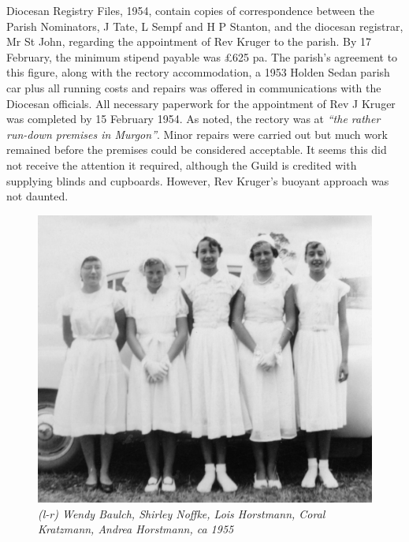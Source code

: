Diocesan Registry Files, 1954, contain copies of correspondence between the Parish Nominators, J Tate, L Sempf and H P Stanton, and the diocesan registrar, Mr St John, regarding the appointment of Rev Kruger to the parish. By 17 February, the minimum stipend payable was \pounds625 pa. The parish's agreement to this figure, along with the rectory accommodation, a 1953 Holden Sedan parish car plus all running costs and repairs was offered in communications with the Diocesan officials. All necessary paperwork for the appointment of Rev J Kruger was completed by 15 February 1954. As noted, the rectory was at \emph{``the rather run-down premises in Murgon''}. Minor repairs were carried out but much work remained before the premises could be considered acceptable. It seems this did not receive the attention it required, although the Guild is credited with supplying blinds and cupboards. However, Rev Kruger's buoyant approach was not daunted.









\begin{figure}[!htb]
\begin{center}
\includegraphics[width=1.\textwidth,center]{../images/confirmation1955.jpg}
\caption{\itshape (l-r) Wendy Baulch, Shirley Noffke, Lois Horstmann, Coral Kratzmann, Andrea Horstmann, ca 1955}
\end{center}
\end{figure}




